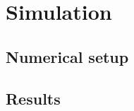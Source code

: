 \documentclass[../main.tex]{subfiles}
\begin{document}
\section{Simulation}
\subsection{Numerical setup}\label{sec:numerical}
\subsection{Results}\label{sec:results}
\end{document}
